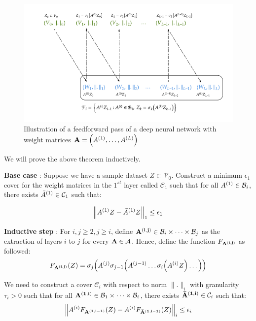 \begin{proof*}
    \begin{figure}[!ht]
        \centering
        \includegraphics[width=\textwidth]{figures/neural-network.png}
        \caption{Illustration of a feedforward pass of a deep neural network with weight matrices ${\bf A}=\Big( A^{(1)}, \dots, A^{(L)} \Big)$}
        \label{fig:neural-network-illustration}
    \end{figure}

    \noindent We will prove the above theorem inductively. 
    
    \noindent\newline\textbf{Base case} : Suppose we have a sample dataset $Z\subset\mathcal{V}_0$. Construct a minimum $\epsilon_1$-cover for the weight matrices in the $1^{st}$ layer called $\mathcal{C}_1$ such that for all $A^{(1)}\in\mathcal{B}_i$, there exists ${\bar A}^{(1)}\in\mathcal{C}_1$ such that:

    \begin{align*}
        \Big\|A^{(1)}Z - {\bar A}^{(1)}Z\Big\|_1 \le \epsilon_1
    \end{align*} 
    
    
    \noindent \textbf{Inductive step} : For $i, j \ge 2, j \ge i$, define ${\bf A^{(i, j)}}\in\mathcal{B}_i\times\dots\times\mathcal{B}_j$ as the extraction of layers $i$ to $j$ for every ${\bf A}\in\mathcal{A}$. Hence, define the function $F_{\bf A^{(i, j)}}$ as followed:
    \begin{align*}
        F_{\bf A^{(i, j)}}(Z) = \sigma_j\Big( 
            A^{(j)}\sigma_{j-1}\Big( 
                A^{(j-1)}\dots\sigma_i\Big( A^{(i)}Z \Big)\dots
             \Big)
         \Big)
    \end{align*} 
    
    
    \noindent We need to construct a cover $\mathcal{C}_i$ with respect to norm $\|.\|_i$ with granularity $\tau_i>0$ such that for all ${\bf A^{(1, i)}}\in \mathcal{B}_1\times\dots\times\mathcal{B}_i$, there exists ${\bf {\bar A}^{(1, i)}}\in \mathcal{C}_{i}$ such that: 
    \begin{align*}
        \Big\|
            A^{(i)}F_{\bf A^{(1, i-1)}}(Z) - {\bar A}^{(i)}F_{\bf {\bar A}^{(1, i-1)}}(Z)
        \Big\|_i \le \epsilon_i
    \end{align*}


\end{proof*}
